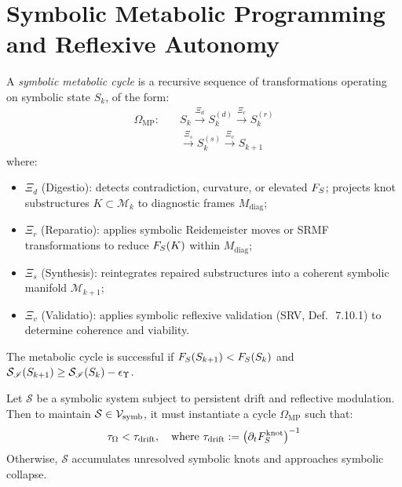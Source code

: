 \section[Symbolic Metabolic Programming]{Symbolic Metabolic Programming and Reflexive Autonomy}
\label{sec:bk8_symbolic_metabolic_programming}
\begin{definition}
\label{definition:bk8_recursive_symbolic_metaboloic_cycle}
A \emph{symbolic metabolic cycle} is a recursive sequence of transformations operating on symbolic state $S_k$, of the form:
\begin{align*}
\Omega_{\mathrm{MP}} :\quad
& S_k \xrightarrow{\Xi_d} S_k^{(d)} \xrightarrow{\Xi_r} S_k^{(r)} \\
& \xrightarrow{\Xi_s} S_k^{(s)} \xrightarrow{\Xi_v} S_{k+1}
\end{align*}
where:
\begin{itemize}
  \item $\Xi_d$ (Digestio): detects contradiction, curvature, or elevated $F_S$; projects knot substructures $K \subset \mathcal{M}_k$ to diagnostic frames $M_{\mathrm{diag}}$;
  \item $\Xi_r$ (Reparatio): applies symbolic Reidemeister moves or SRMF transformations to reduce $F_S(K)$ within $M_{\mathrm{diag}}$;
  \item $\Xi_s$ (Synthesis): reintegrates repaired substructures into a coherent symbolic manifold $\mathcal{M}_{k+1}$;
  \item $\Xi_v$ (Validatio): applies symbolic reflexive validation (SRV, Def.\,\allowbreak~7.10.1) to determine coherence and viability.
\end{itemize}
The metabolic cycle is successful if 
$F_S(S_{k+1}) < F_S(S_k)$ and 
$\mathcal{S}_{\mathscr{I}}(S_{k+1}) \ge \mathcal{S}_{\mathscr{I}}(S_k) - \epsilon_\Upsilon$.
\end{definition}
\begin{theorem}
\label{theorem:bk8_thermodynamic_necessity_of_symbolic_metabolism}
Let $\mathcal{S}$ be a symbolic system subject to persistent drift and reflective modulation. Then to maintain $\mathcal{S} \in \mathcal{V}_{\mathrm{symb}}$, it must instantiate a cycle $\Omega_{\mathrm{MP}}$ such that:
\[
\tau_\Omega < \tau_{\mathrm{drift}}, \quad \text{where } \tau_{\mathrm{drift}} := \left( \partial_t F_S^{\text{knot}} \right)^{-1}
\]
Otherwise, $\mathcal{S}$ accumulates unresolved symbolic knots and approaches symbolic collapse.
\end{theorem}
